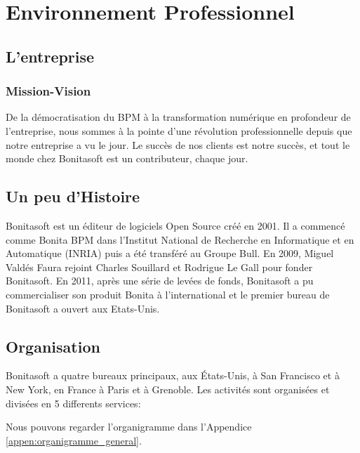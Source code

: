 \section{Environnement Professionnel}
\subsection{L'entreprise}
\subsubsection{Mission-Vision}
De la démocratisation du BPM à la transformation numérique en profondeur de l'entreprise, nous sommes à la pointe d'une révolution professionnelle depuis que notre entreprise a vu le jour.
Le succès de nos clients est notre succès, et tout le monde chez Bonitasoft est un contributeur, chaque jour.
\cite{Bonitasoft2017BONITA}

\subsection{Un peu d'Histoire}
Bonitasoft est un éditeur de logiciels Open Source créé en 2001. Il a commencé comme Bonita BPM dans l'Institut National de Recherche en Informatique et en Automatique (INRIA) puis a été transféré au Groupe Bull.
En 2009, Miguel Valdés Faura rejoint Charles Souillard et Rodrigue Le Gall pour fonder Bonitasoft.
En 2011, après une série de levées de fonds, Bonitasoft a pu commercialiser son produit Bonita à l'international et le premier bureau de Bonitasoft a ouvert aux Etats-Unis.\cite{wikipedia_2018}

\subsection{Organisation}
Bonitasoft a quatre bureaux principaux, aux États-Unis, à San Francisco et à New York, en France à Paris et à Grenoble.
Les activités sont organisées et divisées en 5 differents services:

\begin{center}
\end{center}

Nous pouvons regarder l'organigramme dans l'Appendice \ref{appen:organigramme_general}.







